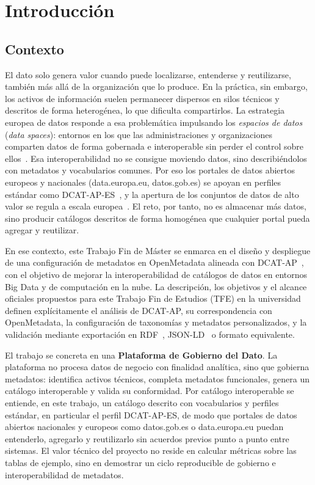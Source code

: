 \chapter{Introducción}\label{cap:introduccion}

\section{Contexto}

El dato solo genera valor cuando puede localizarse, entenderse y reutilizarse, también más allá de la organización que lo produce. En la práctica, sin embargo, los activos de información suelen permanecer dispersos en silos técnicos y descritos de forma heterogénea, lo que dificulta compartirlos. La estrategia europea de datos responde a esa problemática impulsando los \emph{espacios de datos} (\emph{data spaces}): entornos en los que las administraciones y organizaciones comparten datos de forma gobernada e interoperable sin perder el control sobre ellos~\cite{euDataStrategy}. Esa interoperabilidad no se consigue moviendo datos, sino describiéndolos con metadatos y vocabularios comunes. Por eso los portales de datos abiertos europeos y nacionales (data.europa.eu, datos.gob.es) se apoyan en perfiles estándar como DCAT-AP-ES~\cite{datosGobDcatApEs2025}, y la apertura de los conjuntos de datos de alto valor se regula a escala europea~\cite{euHvdRegulation}. El reto, por tanto, no es almacenar más datos, sino producir catálogos descritos de forma homogénea que cualquier portal pueda agregar y reutilizar.

En ese contexto, este Trabajo Fin de Máster se enmarca en el diseño y despliegue de una configuración de metadatos en OpenMetadata alineada con DCAT-AP~\cite{europeDcatAp}, con el objetivo de mejorar la interoperabilidad de catálogos de datos en entornos Big Data y de computación en la nube. La descripción, los objetivos y el alcance oficiales propuestos para este Trabajo Fin de Estudios (TFE) en la universidad definen explícitamente el análisis de DCAT-AP, su correspondencia con OpenMetadata, la configuración de taxonomías y metadatos personalizados, y la validación mediante exportación en RDF~\cite{w3cRdf11}, JSON-LD~\cite{w3cJsonLd} o formato equivalente.

El trabajo se concreta en una \textbf{Plataforma de Gobierno del Dato}. La plataforma no procesa datos de negocio con finalidad analítica, sino que gobierna metadatos: identifica activos técnicos, completa metadatos funcionales, genera un catálogo interoperable y valida su conformidad. Por catálogo interoperable se entiende, en este trabajo, un catálogo descrito con vocabularios y perfiles estándar, en particular el perfil DCAT-AP-ES, de modo que portales de datos abiertos nacionales y europeos como datos.gob.es o data.europa.eu puedan entenderlo, agregarlo y reutilizarlo sin acuerdos previos punto a punto entre sistemas. El valor técnico del proyecto no reside en calcular métricas sobre las tablas de ejemplo, sino en demostrar un ciclo reproducible de gobierno e interoperabilidad de metadatos.


